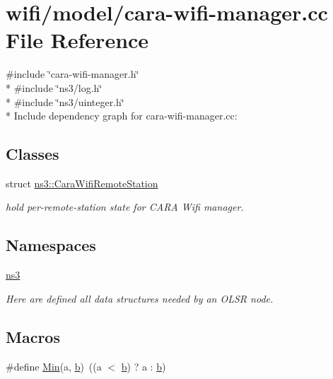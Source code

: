 \hypertarget{cara-wifi-manager_8cc}{}\section{wifi/model/cara-\/wifi-\/manager.cc File Reference}
\label{cara-wifi-manager_8cc}
{\ttfamily \#include \char`\"{}cara-\/wifi-\/manager.\+h\char`\"{}}\\*
{\ttfamily \#include \char`\"{}ns3/log.\+h\char`\"{}}\\*
{\ttfamily \#include \char`\"{}ns3/uinteger.\+h\char`\"{}}\\*
Include dependency graph for cara-\/wifi-\/manager.cc\+:
\subsection*{Classes}
\begin{DoxyCompactItemize}
\item 
struct \hyperlink{structns3_1_1CaraWifiRemoteStation}{ns3\+::\+Cara\+Wifi\+Remote\+Station}
\begin{DoxyCompactList}\small\item\em hold per-\/remote-\/station state for C\+A\+RA Wifi manager. \end{DoxyCompactList}\end{DoxyCompactItemize}
\subsection*{Namespaces}
\begin{DoxyCompactItemize}
\item 
 \hyperlink{namespacens3}{ns3}
\begin{DoxyCompactList}\small\item\em Here are defined all data structures needed by an O\+L\+SR node. \end{DoxyCompactList}\end{DoxyCompactItemize}
\subsection*{Macros}
\begin{DoxyCompactItemize}
\item 
\#define \hyperlink{cara-wifi-manager_8cc_a9e04209162ea72f9985338596262b657}{Min}(a,  \hyperlink{lte__pathloss_8m_a21ad0bd836b90d08f4cf640b4c298e7c}{b})~((a $<$ \hyperlink{lte__pathloss_8m_a21ad0bd836b90d08f4cf640b4c298e7c}{b}) ? a \+: \hyperlink{lte__pathloss_8m_a21ad0bd836b90d08f4cf640b4c298e7c}{b})
\end{DoxyCompactItemize}
